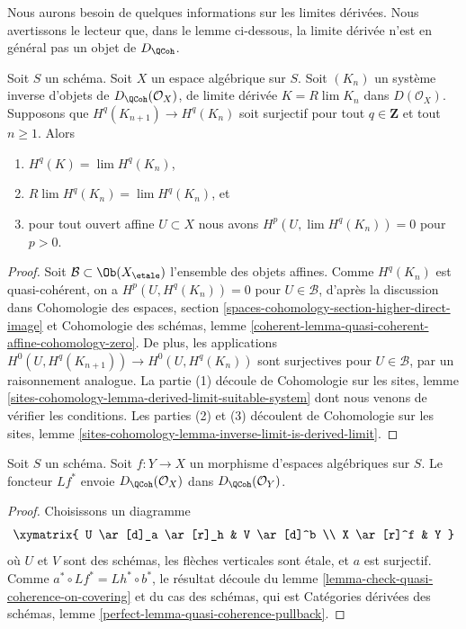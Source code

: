 \noindent
Nous aurons besoin de quelques informations sur les limites dérivées.
Nous avertissons le lecteur que, dans le lemme ci-dessous, la limite dérivée n'est en général pas
un objet de $D_\QCoh$.

\begin{lemma}
\label{lemma-Rlim-quasi-coherent}
Soit $S$ un schéma. Soit $X$ un espace algébrique sur $S$.
Soit $(K_n)$ un système inverse d'objets de
$D_\QCoh(\mathcal{O}_X)$, de limite dérivée
$K = R\lim K_n$ dans $D(\mathcal{O}_X)$. Supposons que $H^q(K_{n + 1}) \to H^q(K_n)$
soit surjectif pour tout $q \in \mathbf{Z}$ et tout $n \geq 1$.
Alors
\begin{enumerate}
\item $H^q(K) = \lim H^q(K_n)$,
\item $R\lim H^q(K_n) = \lim H^q(K_n)$, et
\item pour tout ouvert affine $U \subset X$ nous avons
$H^p(U, \lim H^q(K_n)) = 0$ pour $p > 0$.
\end{enumerate}
\end{lemma}

\begin{proof}
Soit $\mathcal{B} \subset \Ob(X_\etale)$ l'ensemble des objets affines.
Comme $H^q(K_n)$ est quasi-cohérent, on a $H^p(U, H^q(K_n)) = 0$
pour $U \in \mathcal{B}$, d'après la discussion dans
Cohomologie des espaces, section
\ref{spaces-cohomology-section-higher-direct-image}
et
Cohomologie des schémas, lemme
\ref{coherent-lemma-quasi-coherent-affine-cohomology-zero}.
De plus, les applications $H^0(U, H^q(K_{n + 1})) \to H^0(U, H^q(K_n))$
sont surjectives pour $U \in \mathcal{B}$, par un raisonnement analogue.
La partie (1) découle de Cohomologie sur les sites, lemme
\ref{sites-cohomology-lemma-derived-limit-suitable-system}
dont nous venons de vérifier les conditions.
Les parties (2) et (3) découlent de
Cohomologie sur les sites, lemme
\ref{sites-cohomology-lemma-inverse-limit-is-derived-limit}.
\end{proof}

\begin{lemma}
\label{lemma-quasi-coherence-pullback}
Soit $S$ un schéma.
Soit $f : Y \to X$ un morphisme d'espaces algébriques sur $S$.
Le foncteur $Lf^*$ envoie $D_\QCoh(\mathcal{O}_X)$
dans $D_\QCoh(\mathcal{O}_Y)$.
\end{lemma}

\begin{proof}
Choisissons un diagramme
$$
\xymatrix{
U \ar[d]_a \ar[r]_h & V \ar[d]^b \\
X \ar[r]^f & Y
}
$$
où $U$ et $V$ sont des schémas, les flèches verticales sont \'etale, et
$a$ est surjectif. Comme $a^* \circ Lf^* = Lh^* \circ b^*$, le résultat
découle du
lemme \ref{lemma-check-quasi-coherence-on-covering}
et du cas des schémas, qui est
Catégories dérivées des schémas, lemme
\ref{perfect-lemma-quasi-coherence-pullback}.
\end{proof}

